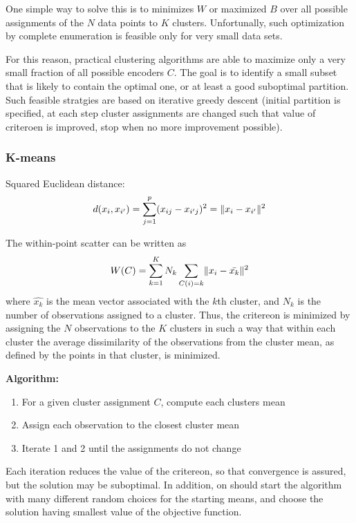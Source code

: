 \documentclass{scrartcl}
\DeclarePairedDelimiter\norm{\lVert}{\rVert}%
\begin{document}
One simple way to solve this is to minimizes \(W\) or maximized \(B\) over all possible assignments of the \(N\) data points to \(K\) clusters. Unfortunally, such optimization by complete enumeration is feasible only for very small data sets.

For this reason, practical clustering algorithms are able to maximize only a very small fraction of all possible encoders \(C\). The goal is to identify a small subset that is likely to contain the optimal one, or at least a good suboptimal partition. Such feasible stratgies are based on iterative greedy descent (initial partition is specified, at each step cluster assignments are changed such that value of criteroen is improved, stop when no more improvement possible).

\subsubsection{K-means}
Squared Euclidean distance:
\[d(x_i, x_{i'}) = \sum_{j=1}^p (x_{ij} - x_{i'j})^2 = \norm{x_i - x_{i'}}^2\]

The within-point scatter can be written as
\[W(C) = \sum_{k=1}^K N_k \sum_{C(i) = k} \norm{x_i - \bar{x_k}}^2\]
where \(\hat{x_k}\) is the mean vector associated with the \(k\)th cluster, and \(N_k\) is the number of observations assigned to a cluster. Thus, the critereon is minimized by assigning the \(N\) observations to the \(K\) clusters in such a way that within each cluster the average dissimilarity of the observations from the cluster mean, as defined by the points in that cluster, is minimized.

\bigbreak

\textbf{Algorithm:}
\begin{enumerate}
    \item
        For a given cluster assignment \(C\), compute each clusters mean
    \item
        Assign each observation to the closest cluster mean
    \item
        Iterate 1 and 2 until the assignments do not change
\end{enumerate}

Each iteration reduces the value of the critereon, so that convergence is assured, but the solution may be suboptimal. In addition, on should start the algorithm with many different random choices for the starting means, and choose the solution having smallest value of the objective function.
\end{document}

